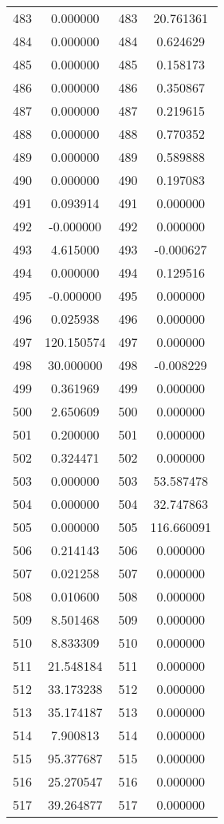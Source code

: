 \documentclass[12pt]{article}
\begin{document}
\begin{longtable}{@{}cccc@{}}
483 & 0.000000 & 483 & 20.761361 \\
484 & 0.000000 & 484 & 0.624629 \\
485 & 0.000000 & 485 & 0.158173 \\
486 & 0.000000 & 486 & 0.350867 \\
487 & 0.000000 & 487 & 0.219615 \\
488 & 0.000000 & 488 & 0.770352 \\
489 & 0.000000 & 489 & 0.589888 \\
490 & 0.000000 & 490 & 0.197083 \\
491 & 0.093914 & 491 & 0.000000 \\
492 & -0.000000 & 492 & 0.000000 \\
493 & 4.615000 & 493 & -0.000627 \\
494 & 0.000000 & 494 & 0.129516 \\
495 & -0.000000 & 495 & 0.000000 \\
496 & 0.025938 & 496 & 0.000000 \\
497 & 120.150574 & 497 & 0.000000 \\
498 & 30.000000 & 498 & -0.008229 \\
499 & 0.361969 & 499 & 0.000000 \\
500 & 2.650609 & 500 & 0.000000 \\
501 & 0.200000 & 501 & 0.000000 \\
502 & 0.324471 & 502 & 0.000000 \\
503 & 0.000000 & 503 & 53.587478 \\
504 & 0.000000 & 504 & 32.747863 \\
505 & 0.000000 & 505 & 116.660091 \\
506 & 0.214143 & 506 & 0.000000 \\
507 & 0.021258 & 507 & 0.000000 \\
508 & 0.010600 & 508 & 0.000000 \\
509 & 8.501468 & 509 & 0.000000 \\
510 & 8.833309 & 510 & 0.000000 \\
511 & 21.548184 & 511 & 0.000000 \\
512 & 33.173238 & 512 & 0.000000 \\
513 & 35.174187 & 513 & 0.000000 \\
514 & 7.900813 & 514 & 0.000000 \\
515 & 95.377687 & 515 & 0.000000 \\
516 & 25.270547 & 516 & 0.000000 \\
517 & 39.264877 & 517 & 0.000000 \\

\end{longtable}
\end{document}
